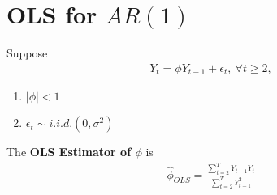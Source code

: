 \documentclass[11pt]{elegantbook}
\begin{document}
\section{OLS for $AR(1)$}
Suppose
\begin{equation}
    \begin{aligned}
        Y_t=\phi Y_{t-1}+\epsilon_t,\ \forall t\geq 2,
    \end{aligned}
    \nonumber
\end{equation}
\begin{enumerate}
    \item $|\phi|<1$
    \item $\epsilon_t\sim{i.i.d.}(0,\sigma^2)$
\end{enumerate}

The \textbf{OLS Estimator of $\phi$} is
\begin{equation}
    \begin{aligned}
        \hat{\phi}_{OLS}=\frac{\sum_{t=2}^TY_{t-1}Y_t}{\sum_{t=2}^T Y_{t-1}^2}
    \end{aligned}
    \nonumber
\end{equation}
\end{document}
